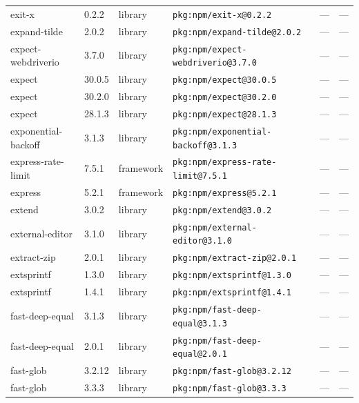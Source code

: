 \documentclass[11pt,a4paper]{article}
\begin{document}
\begin{longtable}{|p{4cm}|p{2cm}|p{1.6cm}|p{5cm}|p{1.5cm}|p{3.5cm}|}
\raggedright exit-x & 0.2.2 & library & \small\texttt{pkg:npm/exit-x@0.2.2} & — & \small — \\
\raggedright expand-tilde & 2.0.2 & library & \small\texttt{pkg:npm/expand-tilde@2.0.2} & — & \small — \\
\raggedright expect-webdriverio & 3.7.0 & library & \small\texttt{pkg:npm/expect-webdriverio@3.7.0} & — & \small — \\
\raggedright expect & 30.0.5 & library & \small\texttt{pkg:npm/expect@30.0.5} & — & \small — \\
\raggedright expect & 30.2.0 & library & \small\texttt{pkg:npm/expect@30.2.0} & — & \small — \\
\raggedright expect & 28.1.3 & library & \small\texttt{pkg:npm/expect@28.1.3} & — & \small — \\
\raggedright exponential-backoff & 3.1.3 & library & \small\texttt{pkg:npm/exponential-backoff@3.1.3} & — & \small — \\
\raggedright express-rate-limit & 7.5.1 & framework & \small\texttt{pkg:npm/express-rate-limit@7.5.1} & — & \small — \\
\raggedright express & 5.2.1 & framework & \small\texttt{pkg:npm/express@5.2.1} & — & \small — \\
\raggedright extend & 3.0.2 & library & \small\texttt{pkg:npm/extend@3.0.2} & — & \small — \\
\raggedright external-editor & 3.1.0 & library & \small\texttt{pkg:npm/external-editor@3.1.0} & — & \small — \\
\raggedright extract-zip & 2.0.1 & library & \small\texttt{pkg:npm/extract-zip@2.0.1} & — & \small — \\
\raggedright extsprintf & 1.3.0 & library & \small\texttt{pkg:npm/extsprintf@1.3.0} & — & \small — \\
\raggedright extsprintf & 1.4.1 & library & \small\texttt{pkg:npm/extsprintf@1.4.1} & — & \small — \\
\raggedright fast-deep-equal & 3.1.3 & library & \small\texttt{pkg:npm/fast-deep-equal@3.1.3} & — & \small — \\
\raggedright fast-deep-equal & 2.0.1 & library & \small\texttt{pkg:npm/fast-deep-equal@2.0.1} & — & \small — \\
\raggedright fast-glob & 3.2.12 & library & \small\texttt{pkg:npm/fast-glob@3.2.12} & — & \small — \\
\raggedright fast-glob & 3.3.3 & library & \small\texttt{pkg:npm/fast-glob@3.3.3} & — & \small — \\

\end{longtable}
\end{document}
